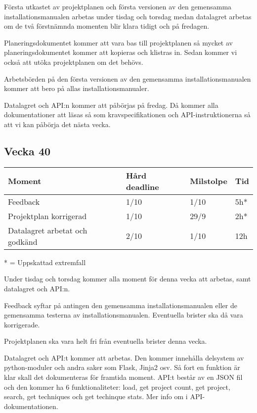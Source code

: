 \documentclass{TDP003mall}
\begin{document}
Första utkastet av projektplanen och första versionen av den gemensamma installationsmanualen arbetas under tisdag och torsdag medan datalagret arbetas om de två förstnämnda momenten blir klara tidigt och på fredagen.

Planeringsdokumentet kommer att vara bas till projektplanen så mycket av planeringsdokumentet kommer att kopieras och klistras in. Sedan kommer vi också att utöka projektplanen om det behövs.

Arbetsbörden på den första versionen av den gemensamma installationsmanualen kommer att bero på allas installationsmanualer.

Datalagret och API:n kommer att påbörjas på fredag. Då kommer alla dokumentationer att läsas så som kravspecifikationen och API-instruktionerna så att vi kan påbörja det nästa vecka.

\subsection*{Vecka 40}
\begin{table}[!h]
\begin{tabularx}{\linewidth}{|X|l|l|l|}
\hline
Moment & Hård deadline & Milstolpe & Tid \\\hline
Feedback & 1/10 & 1/10 & 5h* \\\hline
Projektplan korrigerad & 1/10 & 29/9 & 2h* \\\hline
Datalagret arbetat och godkänd & 2/10 & 1/10 & 12h\\\hline
\end{tabularx}
\end{table}
* = Uppskattad extremfall

Under tisdag och torsdag kommer alla moment för denna vecka att arbetas, samt datalagret och API:n.

Feedback syftar på antingen den gemensamma installationsmanualen eller de gemensamma testerna av installationsmanualen. Eventuella brister ska då vara korrigerade.

Projektplanen ska vara helt fri från eventuella brister denna vecka.

Datalagret och API:t kommer att arbetas. Den kommer innehålla delsystem av python-moduler och andra saker som Flask, Jinja2 osv. Så fort en funktion är klar skall det dokumenteras för framtida moment. API:t består av en JSON fil och den kommer ha 6 funktionaliteter: load, get project count, get project, search, get techniques och get techinque stats. Mer info om i API-dokumentationen.
\end{document}
